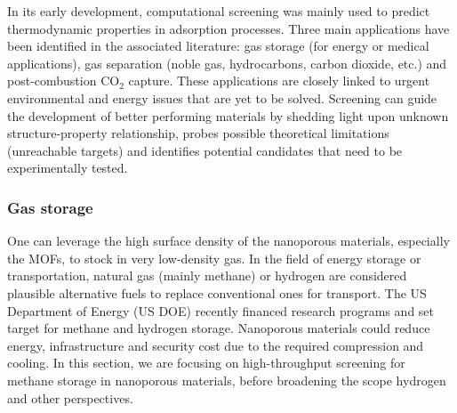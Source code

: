 \documentclass[main.tex]{subfiles}
\begin{document}

In its early development, computational screening was mainly used to predict thermodynamic properties in adsorption processes. Three main applications have been identified in the associated literature: gas storage (for energy or medical applications), gas separation (noble gas, hydrocarbons, carbon dioxide, etc.) and post-combustion CO$_2$ capture. These applications are closely linked to urgent environmental and energy issues that are yet to be solved. Screening can guide the development of better performing materials by shedding light upon unknown structure-property relationship, probes possible theoretical limitations (unreachable targets) and identifies potential candidates that need to be experimentally tested.

\subsubsection{Gas storage}

One can leverage the high surface density of the nanoporous materials, especially the MOFs, to stock in very low-density gas. In the field of energy storage or transportation, natural gas (mainly methane) or hydrogen are considered plausible alternative fuels to replace conventional ones for transport. The US Department of Energy (US DOE) recently financed research programs and set target for methane and hydrogen storage. Nanoporous materials could reduce energy, infrastructure and security cost due to the required compression and cooling. In this section, we are focusing on high-throughput screening for methane storage in nanoporous materials, before broadening the scope hydrogen and other perspectives.
\end{document}
